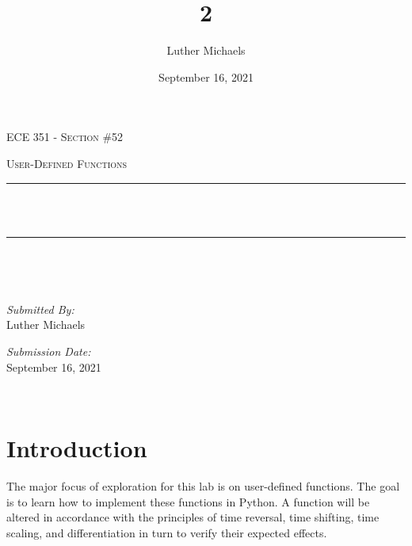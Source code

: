 \documentclass[12pt]{report}
\title{2}	%
\author{Luther Michaels}	%
\date{September 16, 2021}   %
\makeatletter
\let\thetitle\@title
\makeatother
\begin{document}
\begin{titlepage}
    \centering
    \vspace*{0.5 cm}

    \begin{center}    
        \textsc{\Large   ECE 351 - Section \#52}\\[2.0 cm]	
    \end{center}  
	\textsc{\Large User-Defined Functions  }\\[0.5 cm]
	\rule{\linewidth}{0.2 mm} \\[0.4 cm]
	{ \huge \bfseries \thetitle}\\
	\rule{\linewidth}{0.2 mm} \\[1.5 cm]
	\begin{minipage}{0.4\textwidth}
		\begin{flushleft} \large
		\end{flushleft}
		\end{minipage}~
	\begin{minipage}{0.4\textwidth}
		\begin{flushright} \large
			\emph{Submitted By:} \\
			Luther Michaels \break
			
			\emph{Submission Date:} \\
			September 16, 2021
		\end{flushright}
	\end{minipage}\\[2 cm]
\end{titlepage}


\tableofcontents
\pagebreak

\renewcommand{\thesection}{\arabic{section}}
\section{Introduction}

The major focus of exploration for this lab is on user-defined functions. The goal is to learn how to implement these functions in Python. A function will be altered in accordance with the principles of time reversal, time shifting, time scaling, and differentiation in turn to verify their expected effects. \\
\end{document}
